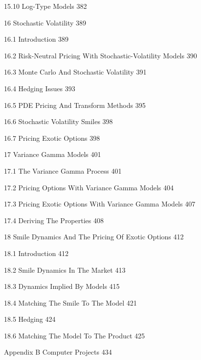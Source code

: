 15.10 Log-Type Models 382



16 Stochastic Volatility 389



16.1 Introduction 389



16.2 Risk-Neutral Pricing With Stochastic-Volatility Models 390



16.3 Monte Carlo And Stochastic Volatility 391



16.4 Hedging Issues 393



16.5 PDE Pricing And Transform Methods 395



16.6 Stochastic Volatility Smiles 398



16.7 Pricing Exotic Options 398



17 Variance Gamma Models 401



17.1 The Variance Gamma Process 401



17.2 Pricing Options With Variance Gamma Models 404



17.3 Pricing Exotic Options With Variance Gamma Models 407



17.4 Deriving The Properties 408



18 Smile Dynamics And The Pricing Of Exotic Options 412



18.1 Introduction 412



18.2 Smile Dynamics In The Market 413



18.3 Dynamics Implied By Models 415



18.4 Matching The Smile To The Model 421



18.5 Hedging 424



18.6 Matching The Model To The Product 425



Appendix B Computer Projects 434



